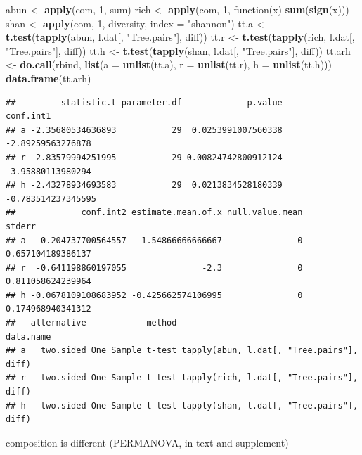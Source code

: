 \documentclass[]{article}
\newenvironment{Shaded}{\begin{snugshade}}{\end{snugshade}}
\newcommand{\KeywordTok}[1]{\textcolor[rgb]{0.13,0.29,0.53}{\textbf{{#1}}}}
\newcommand{\DataTypeTok}[1]{\textcolor[rgb]{0.13,0.29,0.53}{{#1}}}
\newcommand{\DecValTok}[1]{\textcolor[rgb]{0.00,0.00,0.81}{{#1}}}
\newcommand{\StringTok}[1]{\textcolor[rgb]{0.31,0.60,0.02}{{#1}}}
\newcommand{\NormalTok}[1]{{#1}}
\begin{document}
\begin{Shaded}
\begin{Highlighting}[]
\NormalTok{abun <-}\StringTok{ }\KeywordTok{apply}\NormalTok{(com, }\DecValTok{1}\NormalTok{, sum)}
\NormalTok{rich <-}\StringTok{ }\KeywordTok{apply}\NormalTok{(com, }\DecValTok{1}\NormalTok{, function(x) }\KeywordTok{sum}\NormalTok{(}\KeywordTok{sign}\NormalTok{(x)))}
\NormalTok{shan <-}\StringTok{ }\KeywordTok{apply}\NormalTok{(com, }\DecValTok{1}\NormalTok{, diversity, }\DataTypeTok{index =} \StringTok{"shannon"}\NormalTok{)}
\NormalTok{tt.a <-}\StringTok{ }\KeywordTok{t.test}\NormalTok{(}\KeywordTok{tapply}\NormalTok{(abun, l.dat[, }\StringTok{"Tree.pairs"}\NormalTok{], diff))}
\NormalTok{tt.r <-}\StringTok{ }\KeywordTok{t.test}\NormalTok{(}\KeywordTok{tapply}\NormalTok{(rich, l.dat[, }\StringTok{"Tree.pairs"}\NormalTok{], diff))}
\NormalTok{tt.h <-}\StringTok{ }\KeywordTok{t.test}\NormalTok{(}\KeywordTok{tapply}\NormalTok{(shan, l.dat[, }\StringTok{"Tree.pairs"}\NormalTok{], diff))}
\NormalTok{tt.arh <-}\StringTok{ }\KeywordTok{do.call}\NormalTok{(rbind, }
                  \KeywordTok{list}\NormalTok{(}\DataTypeTok{a =} \KeywordTok{unlist}\NormalTok{(tt.a), }\DataTypeTok{r =} \KeywordTok{unlist}\NormalTok{(tt.r), }\DataTypeTok{h =} \KeywordTok{unlist}\NormalTok{(tt.h)))}
\KeywordTok{data.frame}\NormalTok{(tt.arh)}
\end{Highlighting}
\end{Shaded}

\begin{verbatim}
##         statistic.t parameter.df             p.value          conf.int1
## a -2.35680534636893           29  0.0253991007560338  -2.89259563276878
## r -2.83579994251995           29 0.00824742800912124  -3.95880113980294
## h -2.43278934693583           29  0.0213834528180339 -0.783514237345595
##             conf.int2 estimate.mean.of.x null.value.mean            stderr
## a  -0.204737700564557  -1.54866666666667               0 0.657104189386137
## r  -0.641198860197055               -2.3               0 0.811058624239964
## h -0.0678109108683952 -0.425662574106995               0 0.174968940341312
##   alternative            method                                 data.name
## a   two.sided One Sample t-test tapply(abun, l.dat[, "Tree.pairs"], diff)
## r   two.sided One Sample t-test tapply(rich, l.dat[, "Tree.pairs"], diff)
## h   two.sided One Sample t-test tapply(shan, l.dat[, "Tree.pairs"], diff)
\end{verbatim}

composition is different (PERMANOVA, in text and supplement)
\end{document}
